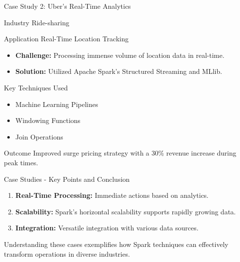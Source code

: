 \documentclass[aspectratio=169]{beamer}
\begin{document}
\begin{frame}{Case Study 2: Uber's Real-Time Analytics}
  \begin{block}{Industry}
    Ride-sharing
  \end{block}
  
  \begin{block}{Application}
    Real-Time Location Tracking
  \end{block}

  \begin{itemize}
    \item \textbf{Challenge:} Processing immense volume of location data in real-time.
    \item \textbf{Solution:} Utilized Apache Spark's Structured Streaming and MLlib.
  \end{itemize}

  \begin{block}{Key Techniques Used}
    \begin{itemize}
      \item Machine Learning Pipelines
      \item Windowing Functions
      \item Join Operations
    \end{itemize}
  \end{block}

  \begin{block}{Outcome}
    Improved surge pricing strategy with a 30\% revenue increase during peak times.
  \end{block}
\end{frame}

\begin{frame}{Case Studies - Key Points and Conclusion}
  \begin{enumerate}
    \item \textbf{Real-Time Processing:} Immediate actions based on analytics.
    \item \textbf{Scalability:} Spark's horizontal scalability supports rapidly growing data.
    \item \textbf{Integration:} Versatile integration with various data sources.
  \end{enumerate}

  Understanding these cases exemplifies how Spark techniques can effectively transform operations in diverse industries.
\end{frame}
\end{document}
